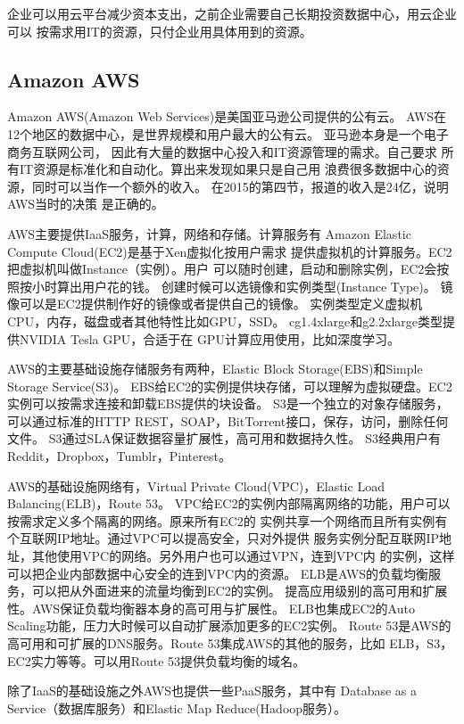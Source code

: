 企业可以用云平台减少资本支出，之前企业需要自己长期投资数据中心，用云企业可以
按需求用IT的资源，只付企业用具体用到的资源。

\subsection{Amazon AWS}
Amazon AWS(Amazon Web Services)是美国亚马逊公司提供的公有云。
AWS在12个地区的数据中心，是世界规模和用户最大的公有云。
亚马逊本身是一个电子商务互联网公司，
因此有大量的数据中心投入和IT资源管理的需求。自己要求
所有IT资源是标准化和自动化。算出来发现如果只是自己用
浪费很多数据中心的资源，同时可以当作一个额外的收入。
在2015的第四节，报道的收入是24亿，说明AWS当时的决策
是正确的。

AWS主要提供IaaS服务，计算，网络和存储。计算服务有
Amazon Elastic Compute Cloud(EC2)是基于Xen虚拟化按用户需求
提供虚拟机的计算服务。EC2把虚拟机叫做Instance（实例）。用户
可以随时创建，启动和删除实例，EC2会按照按小时算出用户花的钱。
创建时候可以选镜像和实例类型(Instance Type)。
镜像可以是EC2提供制作好的镜像或者提供自己的镜像。
实例类型定义虚拟机CPU，内存，磁盘或者其他特性比如GPU，SSD。
cg1.4xlarge和g2.2xlarge类型提供NVIDIA Tesla GPU，合适于在
GPU计算应用使用，比如深度学习。

AWS的主要基础设施存储服务有两种，Elastic Block Storage(EBS)和Simple Storage Service(S3)。
EBS给EC2的实例提供块存储，可以理解为虚拟硬盘。EC2实例可以按需求连接和卸载EBS提供的块设备。
S3是一个独立的对象存储服务，可以通过标准的HTTP REST，SOAP，BitTorrent接口，保存，访问，删除任何文件。
S3通过SLA保证数据容量扩展性，高可用和数据持久性。
S3经典用户有Reddit，Dropbox，Tumblr，Pinterest。\cite{wiki:s3}

AWS的基础设施网络有，Virtual Private Cloud(VPC)，Elastic Load Balancing(ELB)，Route 53。
VPC给EC2的实例内部隔离网络的功能，用户可以按需求定义多个隔离的网络。原来所有EC2的
实例共享一个网络而且所有实例有个互联网IP地址。通过VPC可以提高安全，只对外提供
服务实例分配互联网IP地址，其他使用VPC的网络。另外用户也可以通过VPN，连到VPC内
的实例，这样可以把企业内部数据中心安全的连到VPC内的资源。
ELB是AWS的负载均衡服务，可以把从外面进来的流量均衡到EC2的实例。
提高应用级别的高可用和扩展性。AWS保证负载均衡器本身的高可用与扩展性。
ELB也集成EC2的Auto Scaling功能，压力大时候可以自动扩展添加更多的EC2实例。
Route 53是AWS的高可用和可扩展的DNS服务。Route 53集成AWS的其他的服务，比如
ELB，S3，EC2实力等等。可以用Route 53提供负载均衡的域名。

除了IaaS的基础设施之外AWS也提供一些PaaS服务，其中有
Database as a Service（数据库服务）和Elastic Map Reduce(Hadoop服务）。


